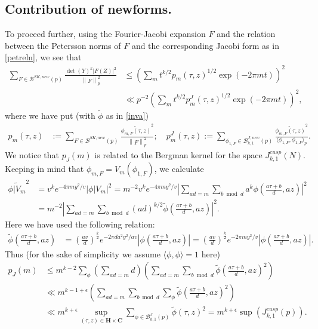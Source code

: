 \documentclass[11pt]{amsart}
\numberwithin{equation}{section}
\theoremstyle{plain}
\theoremstyle{definition}
\newcommand{\mf}{\mathbf}
\newcommand{\mc}{\mathcal}
\newcommand*{\norm}[1]{\left\lVert#1\right\rVert}
\newcommand{\lan}{\langle }
\newcommand{\ran}{\rangle}
\newcommand{\lbr}{\left(}
\newcommand{\rbr}{\right)}
\newcommand{\q}{\quad}
\newcommand{\sumn}{\sum \nolimits}
\newcommand{\jkp}{J_{k,1}^{cusp}(p)}
\newcommand{\jkn}{J^{cusp}_{k,1}(N)}
\begin{document}
\subsection{Contribution of newforms.}\label{newformtype1}
To proceed further, using the Fourier-Jacobi expansion $F$ and the relation between the Petersson norms of $F$ and the corresponding Jacobi form as in \eqref{petreln}, we see that
\begin{align}
         \sum_{F \in \mc B^{SK,new}(p)} \frac{\det(Y)^{k} |F(Z)|^2}{\norm{F}^2_p} &\le
    \left( \sumn_{m}   t^{k/2} p_m(\tau,z)^{1/2} \exp(- 2 \pi m t)    \right)^2 \\
    & \ll p^{-2}  \left( \sumn_{m}   t^{k/2} p_m^J(\tau,z)^{1/2} \exp(- 2 \pi m t)  \right)^2, \label{n2-}
\end{align}
where we have put (with $\tilde{\phi}$ as in \eqref{inva})
\begin{align}
    p_m(\tau,z) &:=  \sum_{F \in \mc B^{SK,new}(p)} \frac{\widetilde{\phi_{m,F}(\tau,z)}^2}{\norm{F}^2_p};\q p_m^J(\tau,z) := \sum_{\phi_{1,F} \in \mc B^{J,new}_{k,1}(p)}  \frac{\widetilde{\phi_{m,F}(\tau,z)}^2}{\lan \phi_{1,F}, \phi_{1,F}\ran_p}.
\end{align}
We notice that $p_J(m)$ is related to the Bergman kernel for the space $\jkn$. Keeping in mind that $\phi_{m,F} = V_m(\phi_{1,F})$, we calculate
\begin{align}\label{Vmtilde}
    \widetilde{\phi|V_m}^2 & =v^{k}e^{-4\pi my^2/v}|\phi|V_m|^2
     = m^{-2} v^{k}e^{-4\pi my^2/v} \left|\sum_{ad=m}\sum_{b\bmod d}a^{k}\phi\left(\frac{a\tau+b}{d},az\right)\right|^2\\
    &= m^{-2} \left|\sum_{ad=m}\sum_{b\bmod d}(a d)^{k/2} \widetilde{\phi}\left(\frac{a\tau+b}{d},az\right)\right|^2.
\end{align}
Here we have used the following relation:
\begin{align}
\widetilde{\phi} \left(  \frac{a\tau+b}{d}, az\right) &= \lbr \frac{av}{d} \rbr^\frac{k}{2} e^{-2 \pi da^2y^2/av} |\phi \left(  \frac{a\tau+b}{d}, az\right) |=\lbr \frac{av}{d} \rbr^\frac{k}{2} e^{-2 \pi my^2/v} |\phi \left(  \frac{a\tau+b}{d}, az\right)  |. \label{tildephi}
\end{align}
Thus (for the sake of simplicity we assume $\lan \phi, \phi \ran =1$ here)
\begin{align}
    p_J(m) &\le m^{ k -2 } \sum_{ \phi } \left( \sum_{ad=m} d \right) \left( \sum_{ad=m} \sum_{b\bmod d} \widetilde{\phi}\left(\frac{a\tau+b}{d},az\right)^2 \right)\\
    &\ll m^{ k-1 + \epsilon } \left( \sum_{ad=m} \sum_{b\bmod d} \sum_{\phi} \widetilde{ \phi }\left(\frac{a\tau+b}{d},az\right)^2 \right)\\
    &\ll m^{k+\epsilon} \sup_{(\tau,z)\in \mf H \times \mf C} \sum_{\phi \in \mc B^J_{k,1}(p)} \widetilde{ \phi } (\tau,z)^2 = m^{k+\epsilon} \sup(\jkp). \label{pjm-supjk}
\end{align}
\end{document}
